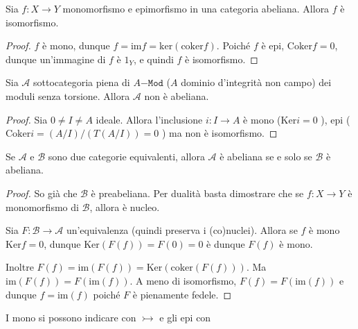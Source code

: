\begin{proposition}{}
    Sia \(f: X \to Y\) monomorfismo e epimorfismo in una categoria abeliana.
    Allora \(f \) è isomorfismo.
\end{proposition}
\begin{proof}{}
    \(f\) è mono, dunque \(f = \mathrm{im}f = \mathrm{ker}{(\mathrm{coker}f)}\).
    Poiché \(f\) è epi, \(\mathrm{Coker}f = 0\), dunque un'immagine di \(f\) è
    \(1_Y\), e quindi \(f\) è isomorfismo.
\end{proof}

\begin{example}{}
    Sia \(\mathcal{A}\) sottocategoria piena di \(A\mathtt{-Mod}\) (\(A\)
    dominio d'integrità non campo) dei moduli senza torsione. Allora \(\mathcal{A}\) non è abeliana.

    \begin{proof}{}
        Sia \(0 \neq I \neq A\) ideale. Allora l'inclusione \(i : I \to A\) è
        mono (\(\mathrm{Ker}i = 0\) ), epi (\(\mathrm{Coker}i = {(A/I)}/{(T{(A /I)})} = 0\) ) ma non è isomorfismo.
    \end{proof}
\end{example}

\begin{proposition}{}
    Se \(\mathcal{A}\) e \(\mathcal{B}\) sono due categorie equivalenti, allora
    \(\mathcal{A}\) è abeliana se e solo se \(\mathcal{B}\) è abeliana.
\end{proposition}
\begin{proof}{}
    So già che \(\mathcal{B}\) è preabeliana. Per dualità basta dimostrare che
    se \(f : X \to Y\) è monomorfismo di \(\mathcal{B}\), allora è nucleo.

    Sia \(F : \mathcal{B} \to \mathcal{A}\) un'equivalenza (quindi preserva i
    (co)nuclei). Allora se \(f\) è mono \(\mathrm{Ker}f = 0\), dunque \(\mathrm{Ker}{(F{(f)})} = F{(0)} = 0\) è dunque \(F{(f)}\) è mono.

    Inoltre \(F{(f)} = \mathrm{im}{(F{(f)})} = \mathrm{Ker}{(\mathrm{coker}{(F{(f)})})}\). Ma \(\mathrm{im}{(F{(f)})} = F{(\mathrm{im}{(f)})}\). A meno di isomorfismo, \(F{(f)} = F{(\mathrm{im}{(f)})}\) e dunque \(f = \mathrm{im}{(f)}\) poiché \(F\) è pienamente fedele.
\end{proof}

\begin{note}[zione]
    I mono si possono indicare con \(\rightarrowtail\) e gli epi con \(\) 
\end{note}

